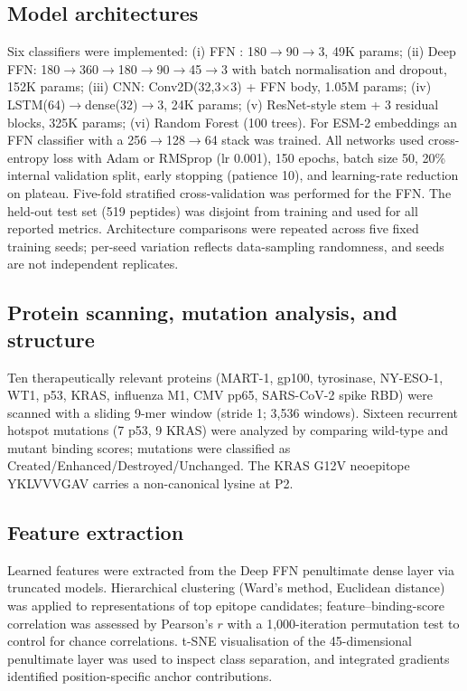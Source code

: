 \begin{methods}
\subsection{Model architectures}
Six classifiers were implemented: (i) FFN \citep{Nielsen03}: 180$\rightarrow$90$\rightarrow$3, 49K params; (ii) Deep FFN: 180$\rightarrow$360$\rightarrow$180$\rightarrow$90$\rightarrow$45$\rightarrow$3 with batch normalisation and dropout, 152K params; (iii) CNN: Conv2D(32,3$\times$3) + FFN body, 1.05M params; (iv) LSTM(64)$\rightarrow$dense(32)$\rightarrow$3, 24K params; (v) ResNet-style stem + 3 residual blocks, 325K params; (vi) Random Forest (100 trees). For ESM-2 embeddings an FFN classifier with a 256$\rightarrow$128$\rightarrow$64 stack was trained. All networks used cross-entropy loss with Adam or RMSprop (lr 0.001), 150 epochs, batch size 50, 20\% internal validation split, early stopping (patience 10), and learning-rate reduction on plateau. Five-fold stratified cross-validation was performed for the FFN. The held-out test set (519 peptides) was disjoint from training and used for all reported metrics. Architecture comparisons were repeated across five fixed training seeds; per-seed variation reflects data-sampling randomness, and seeds are not independent replicates.

\subsection{Protein scanning, mutation analysis, and structure}
Ten therapeutically relevant proteins (MART-1, gp100, tyrosinase, NY-ESO-1, WT1, p53, KRAS, influenza M1, CMV pp65, SARS-CoV-2 spike RBD) were scanned with a sliding 9-mer window (stride 1; 3,536 windows). Sixteen recurrent hotspot mutations (7 p53, 9 KRAS) were analyzed by comparing wild-type and mutant binding scores; mutations were classified as Created/Enhanced/Destroyed/Unchanged. The KRAS G12V neoepitope YKLVVVGAV carries a non-canonical lysine at P2.

\subsection{Feature extraction}
Learned features were extracted from the Deep FFN penultimate dense layer via truncated models. Hierarchical clustering (Ward's method, Euclidean distance) was applied to representations of top epitope candidates; feature--binding-score correlation was assessed by Pearson's $r$ with a 1,000-iteration permutation test to control for chance correlations. t-SNE visualisation of the 45-dimensional penultimate layer was used to inspect class separation, and integrated gradients identified position-specific anchor contributions.


\end{methods}
